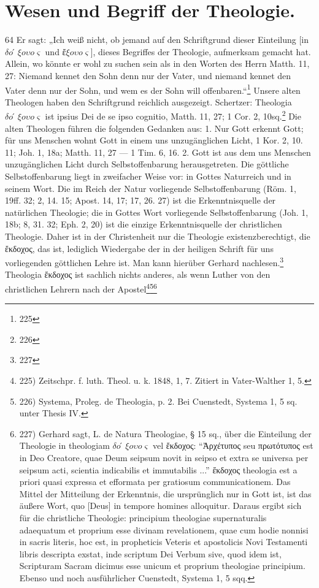 \section*{Wesen und Begriff der Theologie.}\hfill 64 Er sagt: „Ich weiß nicht, ob jemand auf den Schriftgrund dieser Einteilung [in $\delta ó \xi o \upsilon o \varsigma$ und $ἔ \xi o \upsilon o \varsigma$], dieses Begriffes der Theologie, aufmerksam gemacht hat. Allein, wo könnte er wohl zu suchen sein als in den Worten des Herrn Matth. 11, 27: Niemand kennet den Sohn denn nur der Vater, und niemand kennet den Vater denn nur der Sohn, und wem es der Sohn will offenbaren.“\footnote{225} Unsere alten Theologen haben den Schriftgrund reichlich ausgezeigt. Schertzer: Theologia $\delta ó \xi o \upsilon o \varsigma$ ist ipsius Dei de se ipso cognitio, Matth. 11, 27; 1 Cor. 2, 10sq.\footnote{226} Die alten Theologen führen die folgenden Gedanken aus: 1. Nur Gott erkennt Gott; für uns Menschen wohnt Gott in einem uns unzugänglichen Licht, 1 Kor. 2, 10. 11; Joh. 1, 18a; Matth. 11, 27 --- 1 Tim. 6, 16. 2. Gott ist aus dem uns Menschen unzugänglichen Licht durch Selbstoffenbarung herausgetreten. Die göttliche Selbstoffenbarung liegt in zweifacher Weise vor: in Gottes Naturreich und in seinem Wort. Die im Reich der Natur vorliegende Selbstoffenbarung (Röm. 1, 19ff. 32; 2, 14. 15; Apost. 14, 17; 17, 26. 27) ist die Erkenntnisquelle der natürlichen Theologie; die in Gottes Wort vorliegende Selbstoffenbarung (Joh. 1, 18b; 8, 31. 32; Eph. 2, 20) ist die einzige Erkenntnisquelle der christlichen Theologie. Daher ist in der Christenheit nur die Theologie existenzberechtigt, die ἔκδοχος, das ist, lediglich Wiedergabe der in der heiligen Schrift für uns vorliegenden göttlichen Lehre ist. Man kann hierüber Gerhard nachlesen.\footnote{227} Theologia ἔκδοχος ist sachlich nichts anderes, als wenn Luther von den christlichen Lehrern nach der Apostel\footnote{225) Zeitschpr. f. luth. Theol. u. k. 1848, 1, 7. Zitiert in Vater-Walther 1, 5.}\footnote{226) Systema, Proleg. de Theologia, p. 2. Bei Cuenstedt, Systema 1, 5 sq. unter Thesis IV.}\footnote{227) Gerhard sagt, L. de Natura Theologiae, § 15 sq., über die Einteilung der Theologie in theologiam $\delta ó \xi o \upsilon o \varsigma$ vel ἔκδοχος: “Ἀρχέτυπος seu πρωτότυπος est in Deo Creatore, quae Deum seipsum novit in seipso et extra se universa per seipsum acti, scientia indicabilis et immutabilis ...” ἔκδοχος theologia est a priori quasi expressa et efformata per gratiosum communicationem. Das Mittel der Mitteilung der Erkenntnis, die ursprünglich nur in Gott ist, ist das äußere Wort, quo [Deus] in tempore homines alloquitur. Daraus ergibt sich für die christliche Theologie: principium theologiae supernaturalis adaequatum et proprium esse divinam revelationem, quae cum hodie nonnisi in sacris literis, hoc est, in propheticis Veteris et apostolicis Novi Testamenti libris descripta exstat, inde scriptum Dei Verbum sive, quod idem ist, Scripturam Sacram dicimus esse unicum et proprium theologiae principium. Ebenso und noch ausführlicher Cuenstedt, Systema 1, 5 sqq.}